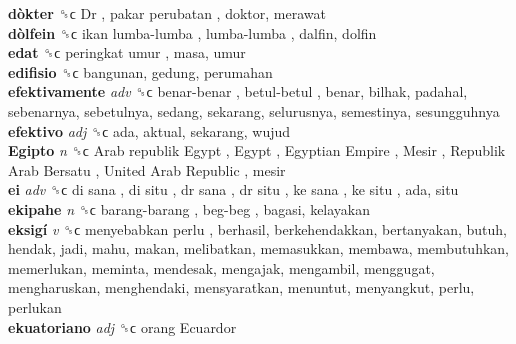 \textbf{dòkter} ␝ϲ   Dr ,  pakar perubatan , doktor, merawat  \\
\textbf{dòlfein} ␝ϲ   ikan lumba-lumba ,  lumba-lumba , dalfin, dolfin  \\
\textbf{edat} ␝ϲ   peringkat umur , masa, umur  \\
\textbf{edifisio} ␝ϲ  bangunan, gedung, perumahan  \\
\textbf{efektivamente} \emph{adv}  ␝ϲ   benar-benar ,  betul-betul , benar, bilhak, padahal, sebenarnya, sebetulnya, sedang, sekarang, selurusnya, semestinya, sesungguhnya  \\
\textbf{efektivo} \emph{adj}  ␝ϲ  ada, aktual, sekarang, wujud  \\
\textbf{Egipto} \emph{n}  ␝ϲ   Arab republik Egypt ,  Egypt ,  Egyptian Empire ,  Mesir ,  Republik Arab Bersatu ,  United Arab Republic , mesir  \\
\textbf{ei} \emph{adv}  ␝ϲ   di sana ,  di situ ,  dr sana ,  dr situ ,  ke sana ,  ke situ , ada, situ  \\
\textbf{ekipahe} \emph{n}  ␝ϲ   barang-barang ,  beg-beg , bagasi, kelayakan  \\
\textbf{eksigí} \emph{v}  ␝ϲ   menyebabkan perlu , berhasil, berkehendakkan, bertanyakan, butuh, hendak, jadi, mahu, makan, melibatkan, memasukkan, membawa, membutuhkan, memerlukan, meminta, mendesak, mengajak, mengambil, menggugat, mengharuskan, menghendaki, mensyaratkan, menuntut, menyangkut, perlu, perlukan  \\
\textbf{ekuatoriano} \emph{adj}  ␝ϲ   orang Ecuardor   \\
